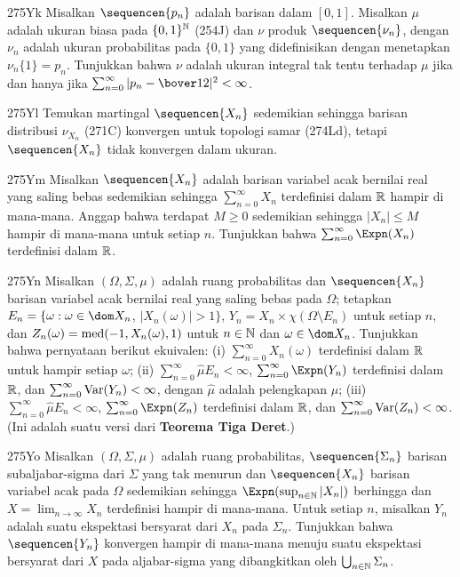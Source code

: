 {\spheader 275Yk Misalkan $\sequencen{p_n}$ adalah barisan dalam $[0,1]$.
Misalkan $\mu$ adalah ukuran biasa pada $\{0,1\}^{\Bbb N}$ (254J) dan $\nu$
produk $\sequencen{\nu_n}$, dengan $\nu_n$ adalah ukuran probabilitas pada
$\{0,1\}$ yang didefinisikan dengan menetapkan $\nu_n\{1\}=p_n$. Tunjukkan
bahwa $\nu$ adalah ukuran integral tak tentu terhadap $\mu$ jika dan hanya
jika $\sum_{n=0}^{\infty}|p_n-\bover12|^2<\infty$.

\spheader 275Yl
Temukan martingal $\sequencen{X_n}$ sedemikian sehingga barisan distribusi
$\nu_{X_n}$ (271C) konvergen untuk topologi samar (274Ld), tetapi
$\sequencen{X_n}$ tidak konvergen dalam ukuran.

\spheader 275Ym Misalkan $\sequencen{X_n}$ adalah barisan variabel acak
bernilai real yang saling bebas sedemikian sehingga
$\sum_{n=0}^{\infty}X_n$ terdefinisi dalam $\Bbb R$ hampir di mana-mana.
Anggap bahwa terdapat $M\ge 0$ sedemikian sehingga $|X_n|\le M$ hampir di
mana-mana untuk setiap $n$. Tunjukkan bahwa
$\sum_{n=0}^{\infty}\Expn(X_n)$ terdefinisi dalam $\Bbb R$.

\spheader 275Yn Misalkan $(\Omega,\Sigma,\mu)$ adalah ruang probabilitas dan
$\sequencen{X_n}$ barisan variabel acak bernilai real yang saling bebas pada
$\Omega$; tetapkan
$E_n=\{\omega:\omega\in\dom X_n$, $|X_n(\omega)|>1\}$,
$Y_n=X_n\times\chi(\Omega\setminus E_n)$ untuk setiap $n$, dan
$Z_n(\omega)=\mathop{\text{med}}\nolimits(-1,X_n(\omega),1)$ untuk $n\in\Bbb N$ dan
$\omega\in\dom X_n$. Tunjukkan bahwa pernyataan berikut ekuivalen:
(i) $\sum_{n=0}^{\infty}X_n(\omega)$ terdefinisi dalam $\Bbb R$ untuk hampir
setiap $\omega$; (ii) $\sum_{n=0}^{\infty}\hat\mu E_n<\infty$,
$\sum_{n=0}^{\infty}\Expn(Y_n)$ terdefinisi dalam $\Bbb R$, dan
$\sum_{n=0}^{\infty}\mathop{\text{Var}}(Y_n)<\infty$, dengan $\hat\mu$ adalah pelengkapan
$\mu$; (iii) $\sum_{n=0}^{\infty}\hat\mu E_n<\infty$,
$\sum_{n=0}^{\infty}\Expn(Z_n)$ terdefinisi dalam $\Bbb R$, dan
$\sum_{n=0}^{\infty}\mathop{\text{Var}}(Z_n)<\infty$. 
(Ini adalah suatu versi dari {\bf Teorema Tiga Deret}.)

\spheader 275Yo Misalkan $(\Omega,\Sigma,\mu)$ adalah ruang probabilitas,
$\sequencen{\Sigma_n}$ barisan subaljabar-sigma dari $\Sigma$ yang tak
menurun dan $\sequencen{X_n}$ barisan variabel acak pada $\Omega$ sedemikian
sehingga $\Expn(\sup_{n\in\Bbb N}|X_n|)$ berhingga dan
$X=\lim_{n\to\infty}X_n$ terdefinisi hampir di mana-mana. Untuk setiap $n$,
misalkan $Y_n$ adalah suatu ekspektasi bersyarat dari $X_n$ pada $\Sigma_n$.
Tunjukkan bahwa $\sequencen{Y_n}$ konvergen hampir di mana-mana menuju suatu
ekspektasi bersyarat dari $X$ pada aljabar-sigma yang dibangkitkan oleh
$\bigcup_{n\in\Bbb N}\Sigma_n$.

}
